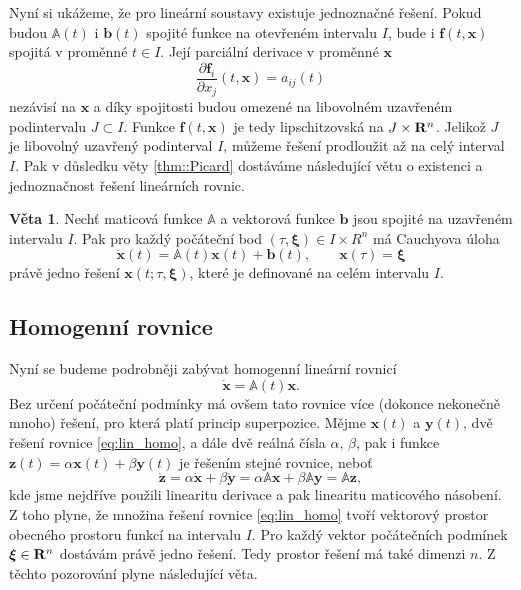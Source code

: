 \documentclass[a4paper, 12pt]{book}
\theoremstyle{definition}
\newtheorem{theorem}{Věta}[section]
\def\Real{{\rm\bf R}}
\def\vc#1{\mathbf{\boldsymbol{#1}}}     %
\def\tn#1{{\mathbb{#1}}}    %
\def\prtl{\partial}                                        %
\begin{document}
Nyní si ukážeme, že pro lineární soustavy existuje jednoznačné řešení. 
Pokud budou $\tn A(t)$ i $\vc b(t)$ spojité funkce na otevřeném intervalu $I$, bude i $\vc f(t, \vc x)$ 
spojitá v proměnné $t\in I$. Její parciální derivace v proměnné $\vc x$
\[
  \frac{\prtl\vc f_i}{\prtl x_j}(t,\vc x) = a_{ij}(t)
\]
nezávisí na $\vc x$ a díky spojitosti budou omezené na libovolném uzavřeném podintervalu $J\subset I$. Funkce $\vc f(t,\vc x)$ je tedy lipschitzovská na $J\times \Real^n$.
Jelikož $J$ je libovolný uzavřený podinterval $I$, můžeme řešení prodloužit až na celý interval $I$.
Pak v důsledku věty \ref{thm::Picard} dostáváme následující větu o existenci a jednoznačnost řešení lineárních rovnic.

\begin{theorem}
Nechť maticová funkce $\tn A$ a vektorová funkce $\vc b$ jsou spojité na 
uzavřeném intervalu $I$. Pak pro každý počáteční bod $(\tau,\vc\xi)\in I\times R^n$ má
Cauchyova úloha
\begin{equation}
\dot {\vc x}(t)={\tn A}(t)\vc x(t)+{\vc b}(t),\qquad \vc x(\tau)=\vc\xi
\end{equation}
právě jedno řešení $\vc x(t;\tau,\vc\xi)$, které je definované na celém 
intervalu $I$.
\end{theorem}

\subsection{Homogenní rovnice}
Nyní se budeme podrobněji zabývat homogenní lineární rovnicí
\begin{equation}
    \label{eq:lin_homo}
    \dot{\vc x}={\tn A}(t)\vc x.
\end{equation}
Bez určení počáteční podmínky má ovšem tato rovnice více (dokonce nekonečně mnoho) řešení, pro která platí princip superpozice.
Mějme $\vc x(t)$ a $\vc y(t)$, dvě řešení rovnice \eqref{eq:lin_homo}, a dále dvě reálná čísla $\alpha$, $\beta$, 
pak i funkce $\vc z(t)=\alpha\vc x(t) + \beta\vc y(t)$ je 
řešením stejné rovnice, neboť
\[
   \dot{\vc z} = \alpha\dot{\vc x} + \beta\dot{\vc y} = \alpha\tn A \vc x  +  \beta \tn A \vc y  = \tn A \vc z,
\]
kde jsme nejdříve použili linearitu derivace a pak linearitu maticového násobení. Z toho plyne, že množina řešení rovnice \eqref{eq:lin_homo}
tvoří vektorový prostor obecného prostoru funkcí na intervalu $I$. Pro každý vektor počátečních podmínek $\vc \xi \in \Real^n$ dostávám právě jedno řešení.
Tedy prostor řešení má také dimenzi $n$. Z těchto pozorování plyne následující věta.
\end{document}
